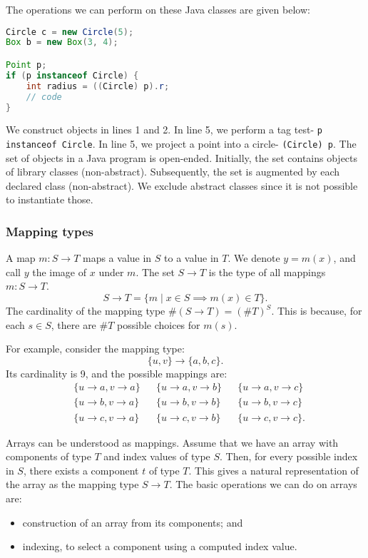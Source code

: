 \documentclass[a4paper, openany]{memoir}
\begin{document}
The operations we can perform on these Java classes are given below:
\begin{lstlisting}[language=java]
Circle c = new Circle(5);
Box b = new Box(3, 4);

Point p;
if (p instanceof Circle) {
    int radius = ((Circle) p).r;
    // code
}
\end{lstlisting}
We construct objects in lines 1 and 2. In line 5, we perform a tag test- \texttt{p instanceof Circle}. In line 5, we project a point into a circle- \texttt{(Circle) p}.
The set of objects in a Java program is open-ended. Initially, the set contains objects of library classes (non-abstract). Subsequently, the set is augmented by each declared class (non-abstract). We exclude abstract classes since it is not possible to instantiate those.

\subsubsection{Mapping types}
A map $m: S \to T$ maps a value in $S$ to a value in $T$. We denote $y = m(x)$, and call $y$ the image of $x$ under $m$. The set $S \to T$ is the type of all mappings $m: S \to T$.
\[S \to T = \{m \mid x \in S \implies m(x) \in T\}.\]
The cardinality of the mapping type $\#(S \to T) = (\#T)^S$. This is because, for each $s \in S$, there are $\# T$ possible choices for $m(s)$.

For example, consider the mapping type:
\[\{u, v\} \to \{a, b, c\}.\]
Its cardinality is 9, and the possible mappings are:
\begin{align*}
    & \{u \to a, v \to a\} && \{u \to a, v \to b\} && \{u \to a, v \to c\} \\
    & \{u \to b, v \to a\} && \{u \to b, v \to b\} && \{u \to b, v \to c\} \\
    & \{u \to c, v \to a\} && \{u \to c, v \to b\} && \{u \to c, v \to c\}.
\end{align*}

Arrays can be understood as mappings. Assume that we have an array with components of type $T$ and index values of type $S$. Then, for every possible index in $S$, there exists a component $t$ of type $T$. This gives a natural representation of the array as the mapping type $S \to T$. The basic operations we can do on arrays are:
\begin{itemize}
    \item construction of an array from its components; and
    \item indexing, to select a component using a computed index value.
\end{itemize}
\end{document}
